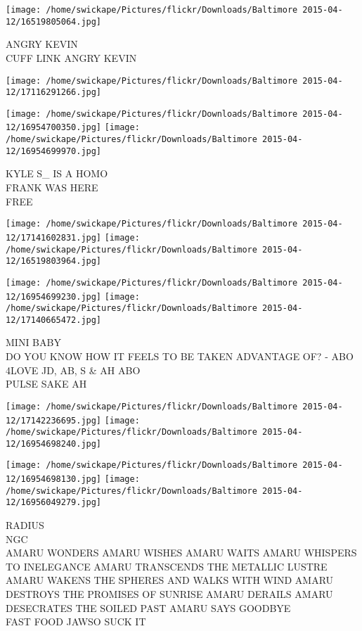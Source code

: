 \documentclass[10pt,letterpaper]{article}
\begin{document}
\vspace{0.25in}
\texttt{[image: /home/swickape/Pictures/flickr/Downloads/Baltimore 2015-04-12/16519805064.jpg]}

ANGRY KEVIN\\
CUFF LINK ANGRY KEVIN\\
\pagebreak

\texttt{[image: /home/swickape/Pictures/flickr/Downloads/Baltimore 2015-04-12/17116291266.jpg]}

\vspace{0.25in}
\texttt{[image: /home/swickape/Pictures/flickr/Downloads/Baltimore 2015-04-12/16954700350.jpg]}
\texttt{[image: /home/swickape/Pictures/flickr/Downloads/Baltimore 2015-04-12/16954699970.jpg]}

KYLE S\_ IS A HOMO\\
FRANK WAS HERE\\
FREE\\
\pagebreak

\texttt{[image: /home/swickape/Pictures/flickr/Downloads/Baltimore 2015-04-12/17141602831.jpg]}
\texttt{[image: /home/swickape/Pictures/flickr/Downloads/Baltimore 2015-04-12/16519803964.jpg]}

\texttt{[image: /home/swickape/Pictures/flickr/Downloads/Baltimore 2015-04-12/16954699230.jpg]}
\texttt{[image: /home/swickape/Pictures/flickr/Downloads/Baltimore 2015-04-12/17140665472.jpg]}

MINI BABY\\
DO YOU KNOW HOW IT FEELS TO BE TAKEN ADVANTAGE OF? {-} ABO\\
4LOVE JD, AB, S \& AH ABO\\
PULSE SAKE AH\\
\pagebreak

\texttt{[image: /home/swickape/Pictures/flickr/Downloads/Baltimore 2015-04-12/17142236695.jpg]}
\texttt{[image: /home/swickape/Pictures/flickr/Downloads/Baltimore 2015-04-12/16954698240.jpg]}

\texttt{[image: /home/swickape/Pictures/flickr/Downloads/Baltimore 2015-04-12/16954698130.jpg]}
\texttt{[image: /home/swickape/Pictures/flickr/Downloads/Baltimore 2015-04-12/16956049279.jpg]}

RADIUS\\
NGC\\
AMARU WONDERS AMARU WISHES AMARU WAITS AMARU WHISPERS TO INELEGANCE AMARU TRANSCENDS THE METALLIC LUSTRE AMARU WAKENS THE SPHERES AND WALKS WITH WIND AMARU DESTROYS THE PROMISES OF SUNRISE AMARU DERAILS AMARU DESECRATES THE SOILED PAST AMARU SAYS GOODBYE\\
FAST FOOD JAWSO SUCK IT\\
\pagebreak
\end{document}
